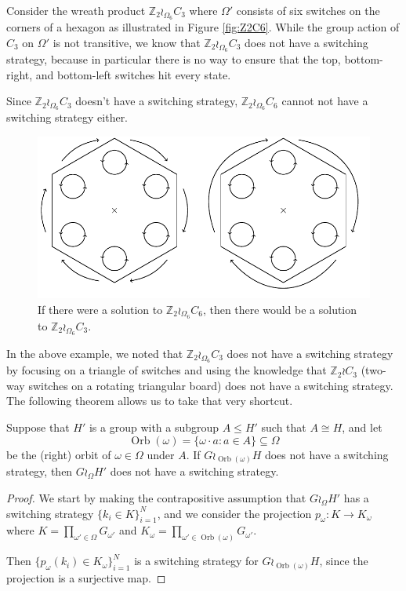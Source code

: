\begin{example}
  Consider the wreath product $\mathbb Z_2 \wr_{\Omega_6} C_3$ where
  $\Omega'$ consists of six switches on the corners of a hexagon as
  illustrated in Figure \ref{fig:Z2C6}. While the group action of $C_3$ on
  $\Omega'$ is not transitive, we know that $\mathbb Z_2 \wr_{\Omega_6} C_3$ does
  not have a switching strategy, because in particular there is no way to
  ensure that the  top, bottom-right, and bottom-left switches hit every state.

  Since $\mathbb Z_2 \wr_{\Omega_6} C_3$ doesn't have a switching strategy,
  $\mathbb Z_2 \wr_{\Omega_6} C_6$ cannot not have a switching strategy either.
  \begin{figure}
    \center
    \includegraphics{assets/tikz_Z2C6.pdf}
    \caption{If there were a solution to $\mathbb Z_2 \wr_{\Omega_6} C_6$,
    then there would be a solution to $\mathbb Z_2 \wr_{\Omega_6} C_3$.}
  \end{figure}
  \label{fig:Z2C6}
\end{example}

In the above example, we noted that $\mathbb Z_2 \wr_{\Omega_6} C_3$ does
not have a switching strategy by focusing on a triangle of switches and
using the knowledge that $\mathbb Z_2 \wr C_3$
(two-way switches on a rotating triangular board) does not have a switching
strategy. The following theorem allows us to take that very shortcut.
\begin{theorem}
  Suppose that $H'$ is a group with a subgroup $A \leq H'$ such that
  $A \cong H$,
  and let \[
    \operatorname{Orb}(\omega) = \{\omega \cdot a : a \in A \} \subseteq \Omega
  \]
  be the (right) orbit of $\omega \in \Omega$ under $A$.
  If $G \wr_{\operatorname{Orb}(\omega)} H$ does not have a switching strategy,
  then $G \wr_\Omega H'$ does not have a switching strategy.
  \label{thm:SpinReduction2}
\end{theorem}
\begin{proof}
  We start by making the contrapositive assumption that $G \wr_\Omega H'$
  has a switching strategy ${\{k_i \in K\}_{i=1}^N}$,
  and we consider the projection
  $p_\omega \colon K \rightarrow K_\omega$ where
  $K = \prod_{\omega' \in \Omega} G_{\omega'}$ and
  $K_{\omega} = \prod_{\omega' \in \operatorname{Orb}(\omega)} G_{\omega'}$.

  Then $\{p_\omega(k_i) \in K_\omega\}_{i=1}^N$ is a switching strategy for
  $G \wr_{\operatorname{Orb}(\omega)} H$, since the projection is a surjective
  map.
\end{proof}

